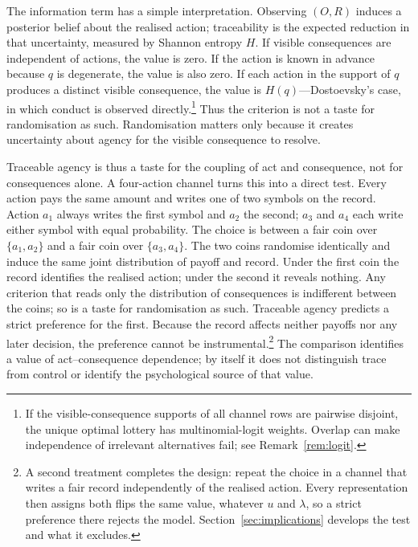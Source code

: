 \documentclass[11pt,a4paper]{article}
\theoremstyle{definition}
\newcommand{\Sh}{H}
\newcommand{\1}{\mathbf 1}
\begin{document}
The information term has a simple interpretation.  Observing $(O,R)$ induces a posterior belief about the realised
action; traceability is the expected reduction in that uncertainty, measured by Shannon entropy $\Sh$.  If visible
consequences are independent of actions, the value is zero.  If the action is known in advance because
$q$ is degenerate, the value is also zero.  If each action in the support of $q$ produces a distinct visible
consequence, the value is $\Sh(q)$---Dostoevsky's case, in which conduct is observed directly.\footnote{If the
visible-consequence supports of all channel rows are pairwise disjoint, the unique optimal lottery has
multinomial-logit weights.  Overlap can make independence of irrelevant alternatives fail; see
Remark~\ref{rem:logit}.}  Thus the criterion is
not a taste for randomisation as such.  Randomisation matters only because it creates uncertainty about agency for the
visible consequence to resolve.



Traceable agency is thus a taste for the coupling of act and consequence, not for consequences alone.  A
four-action channel turns this into a direct test.  Every action pays the same amount and writes one of two
symbols on the record.  Action $a_1$ always writes the first symbol and $a_2$ the second; $a_3$ and $a_4$ each
write either symbol with equal probability.  The choice is between a fair coin over $\{a_1,a_2\}$ and a fair
coin over $\{a_3,a_4\}$.  The two coins randomise identically and induce the same joint distribution of payoff
and record.  Under the first coin the record identifies the realised action; under the second it reveals
nothing.  Any criterion that reads only the distribution of consequences is indifferent between the coins; so is
a taste for randomisation as such.  Traceable agency predicts a strict preference for the first.  Because the
record affects neither payoffs nor any later decision, the preference cannot be
instrumental.\footnote{A second treatment completes the design: repeat
the choice in a channel that writes a fair record independently of the realised action.  Every representation
then assigns both flips the same value, whatever $u$ and $\lambda$, so a strict preference there rejects the
model.  Section~\ref{sec:implications} develops the test and what it excludes.}  The comparison identifies a
value of act--consequence dependence; by itself it does not distinguish trace from control or identify the
psychological source of that value.
\end{document}
